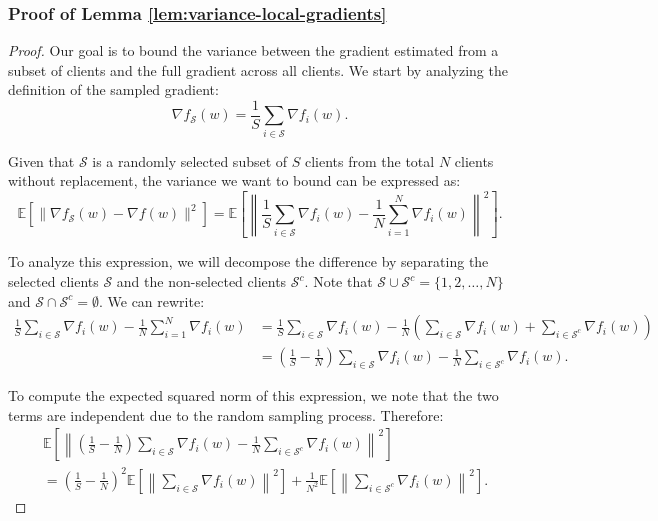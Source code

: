 \subsubsection{Proof of Lemma \ref{lem:variance-local-gradients}}
\begin{proof}
    Our goal is to bound the variance between the gradient estimated from a subset of clients and the full gradient across all clients. We start by analyzing the definition of the sampled gradient:
    \[
        \nabla f_{\mathcal{S}}(w) = \frac{1}{S} \sum_{i \in \mathcal{S}} \nabla f_i(w).
    \]
    
    Given that \(\mathcal{S}\) is a randomly selected subset of \(S\) clients from the total \(N\) clients without replacement, the variance we want to bound can be expressed as:
    \[
        \mathbb{E}[\|\nabla f_{\mathcal{S}}(w) - \nabla f(w)\|^2] = \mathbb{E}\left[\left\|\frac{1}{S} \sum_{i \in \mathcal{S}} \nabla f_i(w) - \frac{1}{N} \sum_{i=1}^{N} \nabla f_i(w)\right\|^2\right].
    \]
    
    To analyze this expression, we will decompose the difference by separating the selected clients \(\mathcal{S}\) and the non-selected clients \(\mathcal{S}^c\). Note that \(\mathcal{S} \cup \mathcal{S}^c = \{1,2,\ldots,N\}\) and \(\mathcal{S} \cap \mathcal{S}^c = \emptyset\). We can rewrite:
    \begin{align*}
        \frac{1}{S} \sum_{i \in \mathcal{S}} \nabla f_i(w) - \frac{1}{N} \sum_{i=1}^{N} \nabla f_i(w) &= \frac{1}{S} \sum_{i \in \mathcal{S}} \nabla f_i(w) - \frac{1}{N} \left(\sum_{i \in \mathcal{S}} \nabla f_i(w) + \sum_{i \in \mathcal{S}^c} \nabla f_i(w) \right) \\
        &= \left(\frac{1}{S} - \frac{1}{N}\right) \sum_{i \in \mathcal{S}} \nabla f_i(w) - \frac{1}{N} \sum_{i \in \mathcal{S}^c} \nabla f_i(w).
    \end{align*}
    
    To compute the expected squared norm of this expression, we note that the two terms are independent due to the random sampling process. Therefore:
    \begin{align*}
        &\mathbb{E}\left[\left\|\left(\frac{1}{S} - \frac{1}{N}\right) \sum_{i \in \mathcal{S}} \nabla f_i(w) - \frac{1}{N} \sum_{i \in \mathcal{S}^c} \nabla f_i(w) \right\|^2\right] \\
        &= \left(\frac{1}{S} - \frac{1}{N}\right)^2 \mathbb{E}\left[\left\|\sum_{i \in \mathcal{S}} \nabla f_i(w)\right\|^2\right] + \frac{1}{N^2} \mathbb{E}\left[\left\|\sum_{i \in \mathcal{S}^c} \nabla f_i(w)\right\|^2\right].
    \end{align*}
    

\end{proof}
